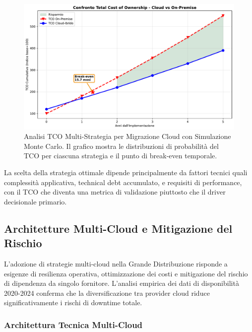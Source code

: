 \begin{figure}[htbp]
\centering
\includegraphics[width=\textwidth]{thesis_figures/cap3/fig_3_4_tco_comparison.pdf}
\caption{Analisi TCO Multi-Strategia per Migrazione Cloud con Simulazione Monte Carlo. Il grafico mostra le distribuzioni di probabilità del TCO per ciascuna strategia e il punto di break-even temporale.}
\label{fig:cloud_tco}
\end{figure}

La scelta della strategia ottimale dipende principalmente da fattori tecnici quali complessità applicativa, technical debt accumulato, e requisiti di performance, con il TCO che diventa una metrica di validazione piuttosto che il driver decisionale primario.%


\subsection{\texorpdfstring{\textbf{Architetture Multi-Cloud e Mitigazione del Rischio}}{3.4.2 - Architetture Multi-Cloud e Mitigazione del Rischio}}

L'adozione di strategie multi-cloud nella Grande Distribuzione risponde a esigenze di resilienza operativa, ottimizzazione dei costi e mitigazione del rischio di dipendenza da singolo fornitore. L'analisi empirica dei dati di disponibilità 2020-2024\autocite{Uptime2024} conferma che la diversificazione tra provider cloud riduce significativamente i rischi di downtime totale.

\subsubsection{\texorpdfstring{\textbf{Architettura Tecnica Multi-Cloud}}{3.4.2.1 - Architettura Tecnica Multi-Cloud}}

